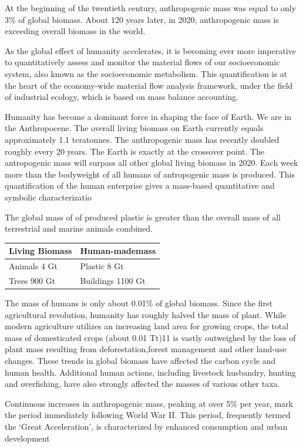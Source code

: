 \documentclass[
]{book}
\begin{document}
At the beginning of the twentieth century, anthropogenic mass was equal to only 3\% of global biomass.
About 120 years later, in 2020, anthropogenic mass is exceeding overall biomass in the world.

As the global effect of humanity accelerates, it is becoming ever more imperative
to quantitatively assess and monitor the material flows of our socioeconomic system,
also known as the socioeconomic metabolism.
This quantification is at the heart of the economy-wide material flow analysis framework,
under the field of industrial ecology, which is based on mass balance accounting.

Humanity has become a dominant force in shaping the face of Earth.
We are in the Anthropocene.
The overall living biomass on Earth currently equals approximately 1.1 teratonnes.
The anthropogenic mass has recently doubled roughly every 20years.
The Earth is exactly at the crossover point.
The antropogenic mass will surpass all other global living biomass in 2020.
Each week more than the bodyweight of all humans of antropogenic mass is produced.
This quantification of the human enterprise gives a mass-based quantitative and symbolic characterizatio

The global mass of of produced plastic is greater than the overall mass of all terrestrial and marine animals combined.

\begin{longtable}[]{@{}ll@{}}
\toprule
Living Biomass & Human-mademass\tabularnewline
\midrule
\endhead
Animals 4 Gt & Plastic 8 Gt\tabularnewline
Trees 900 Gt & Buildings 1100 Gt\tabularnewline
\bottomrule
\end{longtable}

The mass of humans is only about 0.01\% of global biomass.
Since the first agricultural revolution, humanity has roughly halved the mass of plant.
While modern agriculture utilizes an increasing land area for growing crops,
the total mass of domesticated crops (about 0.01 Tt)11 is vastly outweighed by
the loss of plant mass resulting from deforestation,forest management and other land-use changes.
These trends in global biomass have affected the carbon cycle and human health.
Additional human actions, including livestock husbandry, hunting and overfishing,
have also strongly affected the masses of various other taxa.

Continuous increases in anthropogenic mass, peaking at over 5\% per year,
mark the period immediately following World War II.
This period, frequently termed the `Great Acceleration',
is characterized by enhanced consumption and urban development
\end{document}
